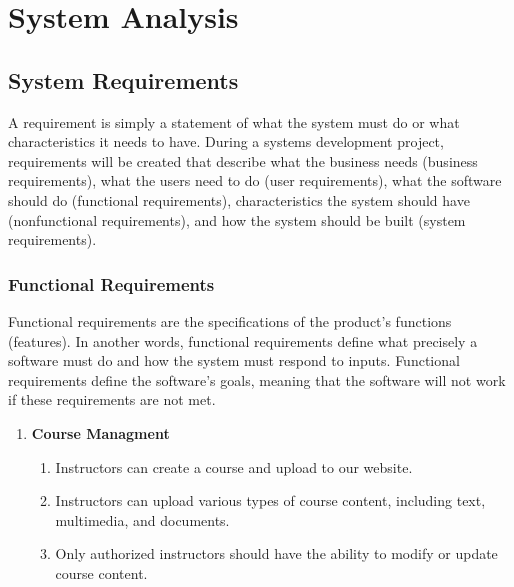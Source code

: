 \chapter{System Analysis}

\section{System Requirements}
A requirement is simply a statement of what the system must do or what characteristics
it needs to have. During a systems development project, requirements will be created
that describe what the business needs (business requirements), what the users
need to do (user requirements), what the software should do (functional requirements),
characteristics the system should have (nonfunctional requirements), and how
the system should be built (system requirements).

\subsection{Functional Requirements}
Functional requirements are the specifications of the product’s functions
(features). In another words, functional requirements define what precisely a
software must do and how the system must respond to inputs. Functional
requirements define the software's goals, meaning that the software will not work if
these requirements are not met.
\begin{enumerate}
        \begin{enumerate}[label*=\arabic*.]
            \item The system will allow users to create an account.
            \item The system must validate users credentials to login.
            \item Users should have the ability to reset their passwords in case of forgotten credentials. 
        \end{enumerate}
        \begin{enumerate}[label*=\arabic*.]
            \item Students can enroll courses and see course content
              We will extend this to enroll paid course wit credit card, debit card etc. in the future.
        \end{enumerate}
    \item \textbf{Course Managment} \hfill
        \begin{enumerate}[label*=\arabic*.]
            \item Instructors can create a course and upload to our website.
            \item Instructors can upload various types of course content, including text, multimedia, and documents.
            \item Only authorized instructors should have the ability to modify or update course content.
        \end{enumerate}
\end{enumerate}

